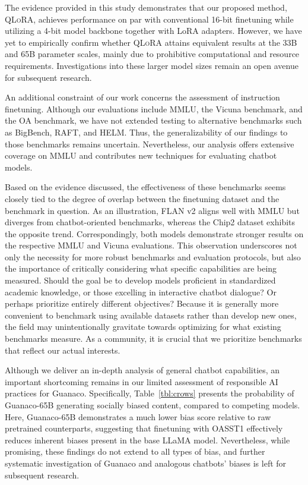 The evidence provided in this study demonstrates that our proposed method, \textsc{QLoRA}, achieves performance on par with conventional 16-bit finetuning while utilizing a 4-bit model backbone together with LoRA adapters. However, we have yet to empirically confirm whether \textsc{QLoRA} attains equivalent results at the 33B and 65B parameter scales, mainly due to prohibitive computational and resource requirements. Investigations into these larger model sizes remain an open avenue for subsequent research.

An additional constraint of our work concerns the assessment of instruction finetuning. Although our evaluations include MMLU, the Vicuna benchmark, and the OA benchmark, we have not extended testing to alternative benchmarks such as BigBench, RAFT, and HELM. Thus, the generalizability of our findings to those benchmarks remains uncertain. Nevertheless, our analysis offers extensive coverage on MMLU and contributes new techniques for evaluating chatbot models.

Based on the evidence discussed, the effectiveness of these benchmarks seems closely tied to the degree of overlap between the finetuning dataset and the benchmark in question. As an illustration, FLAN v2 aligns well with MMLU but diverges from chatbot-oriented benchmarks, whereas the Chip2 dataset exhibits the opposite trend. Correspondingly, both models demonstrate stronger results on the respective MMLU and Vicuna evaluations. This observation underscores not only the necessity for more robust benchmarks and evaluation protocols, but also the importance of critically considering what specific capabilities are being measured. Should the goal be to develop models proficient in standardized academic knowledge, or those excelling in interactive chatbot dialogue? Or perhaps prioritize entirely different objectives? Because it is generally more convenient to benchmark using available datasets rather than develop new ones, the field may unintentionally gravitate towards optimizing for what existing benchmarks measure. As a community, it is crucial that we prioritize benchmarks that reflect our actual interests.

Although we deliver an in-depth analysis of general chatbot capabilities, an important shortcoming remains in our limited assessment of responsible AI practices for {Guanaco}. Specifically, Table~\ref{tbl:crows} presents the probability of {Guanaco}-65B generating socially biased content, compared to competing models. Here, {Guanaco}-65B demonstrates a much lower bias score relative to raw pretrained counterparts, suggesting that finetuning with OASST1 effectively reduces inherent biases present in the base LLaMA model. Nevertheless, while promising, these findings do not extend to all types of bias, and further systematic investigation of {Guanaco} and analogous chatbots’ biases is left for subsequent research.

